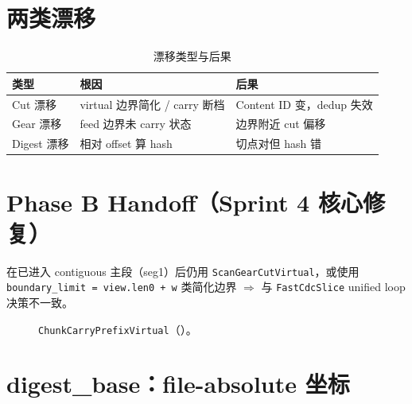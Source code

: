 \section{两类漂移}

\begin{table}[htbp]
\centering
\caption{漂移类型与后果}
\label{tab:drift-types}
\small
\begin{tabular}{@{}lll@{}}
\toprule
类型 & 根因 & 后果 \\
\midrule
Cut 漂移 & virtual 边界简化 / carry 断档 & Content ID 变，dedup 失效 \\
Gear 漂移 & feed 边界未 carry 状态 & 边界附近 cut 偏移 \\
Digest 漂移 & 相对 offset 算 hash & 切点对但 hash 错 \\
\bottomrule
\end{tabular}
\end{table}

\section{Phase B Handoff（Sprint 4 核心修复）}

\begin{warnbox}
在已进入 contiguous 主段（seg1）后仍用 \texttt{ScanGearCutVirtual}，或使用\\
\texttt{boundary\_limit = view.len0 + w} 类简化边界 $\Rightarrow$ 与 \texttt{FastCdcSlice} unified loop 决策不一致。
\end{warnbox}

\begin{figure}[htbp]
\centering
{}
\caption{\texttt{ChunkCarryPrefixVirtual}（）。}
\label{fig:handoff}
\end{figure}

\section{digest\_base：file-absolute 坐标}

